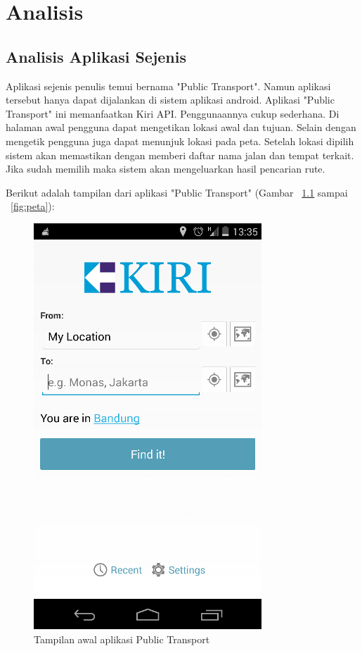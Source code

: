 \chapter{Analisis}
\label{chap:analisi}

\section{Analisis Aplikasi Sejenis}
\label{lab:Analisis Aplikasi Sejenis}
\hspace{0.5cm} Aplikasi sejenis penulis temui bernama "Public Transport". Namun aplikasi tersebut hanya dapat dijalankan di sistem aplikasi android. Aplikasi "Public Transport" ini memanfaatkan Kiri API. Penggunaannya cukup sederhana. Di halaman awal pengguna dapat mengetikan lokasi awal dan tujuan. Selain dengan mengetik pengguna juga dapat menunjuk lokasi pada peta. Setelah lokasi dipilih sistem akan memastikan dengan memberi daftar nama jalan dan tempat terkait. Jika sudah memilih maka sistem akan mengeluarkan hasil pencarian rute.

Berikut adalah tampilan dari aplikasi "Public Transport" (Gambar ~\ref{fig:home} sampai ~\ref{fig:peta}):

\begin{figure}[h]
	\centering
		\includegraphics[scale=0.5]{Gambar/KIRI_Android/home}
	\caption{Tampilan awal aplikasi Public Transport}
	\label{fig:home}
\end{figure}

